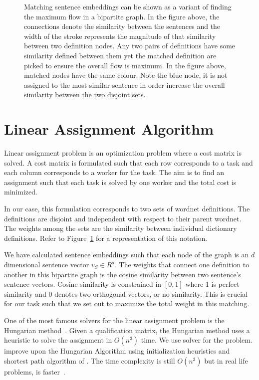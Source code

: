 \begin{figure}[htbp]
    \centering
    \caption{Matching sentence embeddings can be shown as a variant of finding the maximum flow in a bipartite graph. In the figure above, the connections denote the similarity between the sentences and the width of the stroke represents the magnitude of that similarity between two definition nodes. Any two pairs of definitions have some similarity defined between them yet the matched definition are picked to ensure the overall flow is maximum. In the figure above, matched nodes have the same colour. Note the \textcolor[rgb]{0.17,0.48,0.71}{blue} node, it is not assigned to the most similar sentence in order increase the overall similarity between the two disjoint sets.}%
    \label{fig:bipartite_graph}
\end{figure}

\section{Linear Assignment Algorithm}%
\label{sec:linear_assignment_algorithm}

Linear assignment problem is an optimization problem where a cost matrix is solved.
A cost matrix is formulated such that each row corresponds to a task and each column corresponds to a worker for the task.
The aim is to find an assignment such that each task is solved by one worker and the total cost is minimized.

In our case, this formulation corresponds to two sets of wordnet definitions.
The definitions are disjoint and independent with respect to their parent wordnet.
The weights among the sets are the similarity between individual dictionary definitions.
Refer to Figure~\ref{fig:bipartite_graph} for a representation of this notation.

We have calculated sentence embeddings such that each node of the graph is an $d$ dimensional sentence vector $v_S \in R^{d}$.
The weights that connect one definition to another in this bipartite graph is the cosine similarity between two sentence's sentence vectors.
Cosine similarity is constrained in $[0,1]$ where 1 is perfect similarity and 0 denotes two orthogonal vectors, or no similarity.
This is crucial for our task such that we set out to maximize the total weight in this matching.

One of the most famous solvers for the linear assignment problem is the Hungarian method~\cite{kuhn_hungarian_1955}.
Given a qualification matrix, the Hungarian method uses a heuristic to solve the assignment in $O(n^3)$ time.
We use \textcite{jonker_shortest_1987} solver for the problem.
\citeauthor{jonker_shortest_1987} improve upon the Hungarian Algorithm using initialization heuristics and shortest path algorithm of \textcite{dijkstra_note_1959}.
The time complexity is still $O(n^3)$ but in real life problems, \citeauthor{jonker_shortest_1987} is faster~\cite{ruder_discriminative_2018}.

